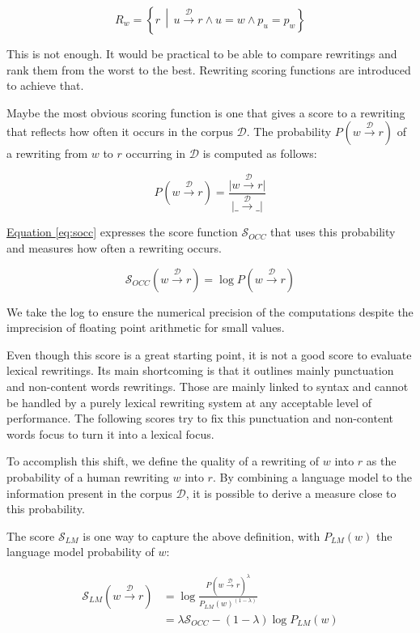 \documentclass[a4paper, 11pt, onepage]{scrreprt}
\newcommand\equaref[1]{\hyperref[#1]{Equation \ref*{#1}}}
\newcommand\maps[1]{\xrightarrow{\mathcal{#1}}}
\newcommand\card[1]{\lvert #1 \rvert}
\newcommand\suchthat{\, \middle| \,}
\newcommand\proba[2][]{P_{#1} \left( #2 \right)}
\begin{document}
\begin{equation*}
  R_w = \left\{
    r \suchthat u \maps{D} r \land u = w \land p_u = p_w
  \right\}
\end{equation*}

This is not enough. It would be practical to be able to compare
rewritings and rank them from the worst to the best. Rewriting scoring
functions are introduced to achieve that.

Maybe the most obvious scoring function is one that gives a score to a
rewriting that reflects how often it occurs in the corpus
$\mathcal{D}$. The probability $\proba{w \maps{D} r}$ of a rewriting
from $w$ to $r$ occurring in $\mathcal{D}$ is computed as follows:

\begin{equation*}
  \proba{w \maps{D} r} = \frac{\card{w \maps{D} r}}{\card{\_ \maps{D} \_}}
\end{equation*}

\equaref{eq:socc} expresses the score function $\mathcal{S}_{OCC}$
that uses this probability and measures how often a rewriting occurs.

\begin{equation}
  \label{eq:socc}
  \mathcal{S}_{OCC}(w \maps{D} r) = \log \proba{w \maps{D} r}
\end{equation}

We take the log to ensure the numerical precision of the computations
despite the imprecision of floating point arithmetic for small values.

Even though this score is a great starting point, it is not a good
score to evaluate lexical rewritings. Its main shortcoming is that it
outlines mainly punctuation and non-content words rewritings. Those
are mainly linked to syntax and cannot be handled by a purely lexical
rewriting system at any acceptable level of performance. The following
scores try to fix this punctuation and non-content words focus to turn
it into a lexical focus.

To accomplish this shift, we define the quality of a rewriting of $w$
into $r$ as the probability of a human rewriting $w$ into $r$. By
combining a language model to the information present in the corpus
$\mathcal{D}$, it is possible to derive a measure close to this
probability.

The score $\mathcal{S}_{LM}$ is one way to capture the above
definition, with $\proba[LM]{w}$ the language model probability of
$w$:

\begin{align}
  \label{eq:slm1}
  \mathcal{S}_{LM}(w \maps{D} r) & = \log \frac{\proba{w \maps{D} r}^\lambda}%
  {\proba[LM]{w}^{(1 - \lambda)}} \\
  \label{eq:slm2}
  & = \lambda \mathcal{S}_{OCC} - (1 - \lambda) \log \proba[LM]{w}
\end{align}
\end{document}
